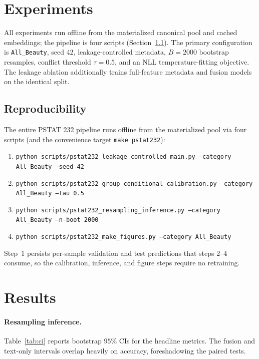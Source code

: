 \documentclass[11pt,a4paper]{article}
\begin{document}
\section{Experiments}
\label{sec:experiments}

All experiments run offline from the materialized canonical pool and cached
embeddings; the pipeline is four scripts (Section~\ref{sec:repro}). The primary
configuration is \texttt{All\_Beauty}, seed $42$, leakage-controlled metadata,
$B=2000$ bootstrap resamples, conflict threshold $\tau=0.5$, and an NLL
temperature-fitting objective. The leakage ablation additionally trains
full-feature metadata and fusion models on the identical split.

\subsection{Reproducibility}
\label{sec:repro}
The entire PSTAT 232 pipeline runs offline from the materialized pool via four
scripts (and the convenience target \texttt{make pstat232}):
\begin{enumerate}[leftmargin=*,nosep]
  \item \texttt{python scripts/pstat232\_leakage\_controlled\_main.py --category All\_Beauty --seed 42}
  \item \texttt{python scripts/pstat232\_group\_conditional\_calibration.py --category All\_Beauty --tau 0.5}
  \item \texttt{python scripts/pstat232\_resampling\_inference.py --category All\_Beauty --n-boot 2000}
  \item \texttt{python scripts/pstat232\_make\_figures.py --category All\_Beauty}
\end{enumerate}
Step~1 persists per-sample validation and test predictions that steps 2--4
consume, so the calibration, inference, and figure steps require no retraining.

\section{Results}
\label{sec:results}

\paragraph{Resampling inference.}
Table~\ref{tab:ci} reports bootstrap $95\%$ CIs for the headline metrics. The
fusion and text-only intervals overlap heavily on accuracy, foreshadowing the
paired tests.
\end{document}

